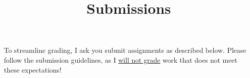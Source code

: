\documentclass{article}
\title{Submissions}
\begin{document}
\renderTitle

\noindent
To streamline grading, I ask you submit assignments as described below.
Please follow the submission guidelines, as I \underline{will not grade}
work that does not meet these expectations!
\end{document}
